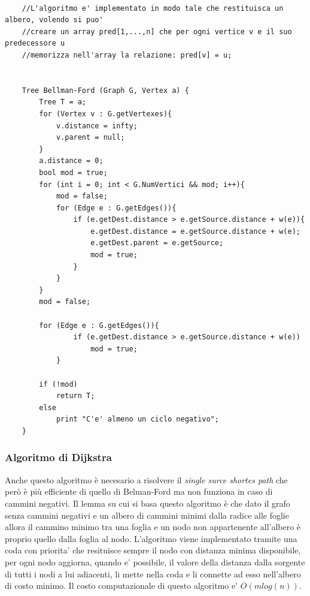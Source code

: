\documentclass{article}
\begin{document}
\begin{verbatim}

    //L'algoritmo e' implementato in modo tale che restituisca un albero, volendo si puo'
    //creare un array pred[1,...,n] che per ogni vertice v e il suo predecessore u
    //memorizza nell'array la relazione: pred[v] = u; 


    Tree Bellman-Ford (Graph G, Vertex a) {
        Tree T = a;
        for (Vertex v : G.getVertexes){
            v.distance = infty;
            v.parent = null;
        }
        a.distance = 0;
        bool mod = true;
        for (int i = 0; int < G.NumVertici && mod; i++){
            mod = false;
            for (Edge e : G.getEdges()){
                if (e.getDest.distance > e.getSource.distance + w(e)){
                    e.getDest.distance = e.getSource.distance + w(e);
                    e.getDest.parent = e.getSource;
                    mod = true;
                }
            }
        }
        mod = false;

        for (Edge e : G.getEdges()){
                if (e.getDest.distance > e.getSource.distance + w(e))
                    mod = true;
            }

        if (!mod)
            return T;
        else
            print "C'e' almeno un ciclo negativo";
    }
\end{verbatim}






\subsubsection{Algoritmo di Dijkstra}
Anche questo algoritmo è necesario a risolvere il \textit{single surce shortes path} che però è più efficiente di quello di Belman-Ford ma non funziona in caso di cammini negativi.
Il lemma su cui si basa questo algoritmo è che dato il grafo senza cammini negativi e un albero di cammini minimi dalla radice alle foglie allora il cammino minimo tra una foglia e un nodo non appartenente all'albero è proprio quello dalla foglia al nodo.
L'algoritmo viene implementato tramite una coda con priorita' che resituisce sempre il nodo con distanza minima disponibile, per ogni nodo aggiorna, quando e' possibile, il valore della distanza dalla sorgente di tutti i nodi a lui adiacenti, li mette nella coda e li connette ad esso nell'albero di costo minimo.
Il costo computazionale di questo algoritmo e' $O(mlog(n))$.
\end{document}
